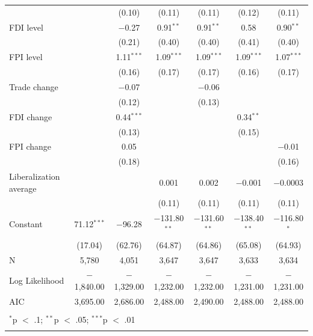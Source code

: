 \documentclass[12pt,a4paper]{article}\usepackage[]{graphicx}\usepackage[]{color}
\begin{document}
\begin{table}[!htbp]
\begin{tabular}{@{\extracolsep{5pt}}lcccccc}
  &  & (0.10) & (0.11) & (0.11) & (0.12) & (0.11) \\ 
  FDI level &  & $-$0.27 & 0.91$^{**}$ & 0.91$^{**}$ & 0.58 & 0.90$^{**}$ \\ 
  &  & (0.21) & (0.40) & (0.40) & (0.41) & (0.40) \\ 
  FPI level &  & 1.11$^{***}$ & 1.09$^{***}$ & 1.09$^{***}$ & 1.09$^{***}$ & 1.07$^{***}$ \\ 
  &  & (0.16) & (0.17) & (0.17) & (0.16) & (0.17) \\ 
  Trade change &  & $-$0.07 &  & $-$0.06 &  &  \\ 
  &  & (0.12) &  & (0.13) &  &  \\ 
  FDI change &  & 0.44$^{***}$ &  &  & 0.34$^{**}$ &  \\ 
  &  & (0.13) &  &  & (0.15) &  \\ 
  FPI change &  & 0.05 &  &  &  & $-$0.01 \\ 
  &  & (0.18) &  &  &  & (0.16) \\ 
  Liberalization average &  &  & 0.001 & 0.002 & $-$0.001 & $-$0.0003 \\ 
  &  &  & (0.11) & (0.11) & (0.11) & (0.11) \\ 
  Constant & 71.12$^{***}$ & $-$96.28 & $-$131.80$^{**}$ & $-$131.60$^{**}$ & $-$138.40$^{**}$ & $-$116.80$^{*}$ \\ 
  & (17.04) & (62.76) & (64.87) & (64.86) & (65.08) & (64.93) \\ 
 N & 5,780 & 4,051 & 3,647 & 3,647 & 3,633 & 3,634 \\ 
Log Likelihood & $-$1,840.00 & $-$1,329.00 & $-$1,232.00 & $-$1,232.00 & $-$1,231.00 & $-$1,231.00 \\ 
AIC & 3,695.00 & 2,686.00 & 2,488.00 & 2,490.00 & 2,488.00 & 2,488.00 \\ 
\hline \\[-1.8ex] 
\multicolumn{7}{l}{$^{*}$p $<$ .1; $^{**}$p $<$ .05; $^{***}$p $<$ .01} \\ 
\normalsize 
\end{tabular} 
\end{table} 
\end{document}
